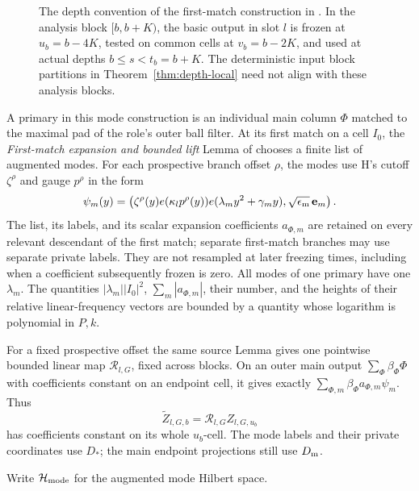 \begin{figure}[ht]
\centering

\caption{The depth convention of the first-match construction in
\cite[Section~8]{H}.  In the analysis block \([b,b+K)\), the basic
output in slot \(l\) is frozen at \(u_b=b-4K\), tested on common
cells at \(v_b=b-2K\), and used at actual depths
\(b\le s<t_b=b+K\).  The deterministic input block partitions in
Theorem~\ref{thm:depth-local} need not align with these analysis blocks.}
\label{fig:frozen-depths}
\end{figure}

A primary in this mode construction is an individual main column
\(\Phi\) matched to the maximal pad of the role's outer ball
filter.  At its first match on a cell \(I_0\), the
\emph{First-match expansion and bounded lift} Lemma of
\cite[Section~8]{H} chooses a finite list of augmented modes.
For each prospective branch offset \(\rho\), the modes use H's
cutoff \(\zeta^\rho\) and gauge \(p^\rho\) in the form
\[
 \psi_m(y)=
 \left(\zeta^\rho(y)e(\kappa_l p^\rho(y))
       e(\lambda_m y^2+\gamma_m y),
       \sqrt{\epsilon_{\rm m}}\,\mathbf e_m\right).
\]
The list, its labels, and its scalar expansion coefficients
\(a_{\Phi,m}\) are retained on every relevant descendant of the
first match; separate first-match branches may use separate private
labels.  They are not resampled at later freezing times, including
when a coefficient subsequently frozen is zero.  All modes of
one primary have one \(\lambda_m\).  The quantities
\(|\lambda_m||I_0|^2\), \(\sum_m|a_{\Phi,m}|\), their number, and
the heights of their relative linear-frequency vectors are bounded
by a quantity whose logarithm is polynomial in \(P,k\).

For a fixed prospective offset the same source Lemma gives one
pointwise bounded linear map \(\mathcal R_{l,G}\), fixed across
blocks.  On an outer main output
\(\sum_\Phi\beta_\Phi\Phi\) with coefficients constant on an
endpoint cell, it gives exactly
\(\sum_{\Phi,m}\beta_\Phi a_{\Phi,m}\psi_m\).  Thus
\[
 \widetilde Z_{l,G,b}=\mathcal R_{l,G}Z_{l,G,u_b}
\]
has coefficients constant on its whole \(u_b\)-cell.  The mode
labels and their private coordinates use \(D_*\); the main
endpoint projections still use \(D_{\rm m}\).

Write \(\mathcal H_{\rm mode}\) for the augmented mode Hilbert space.

